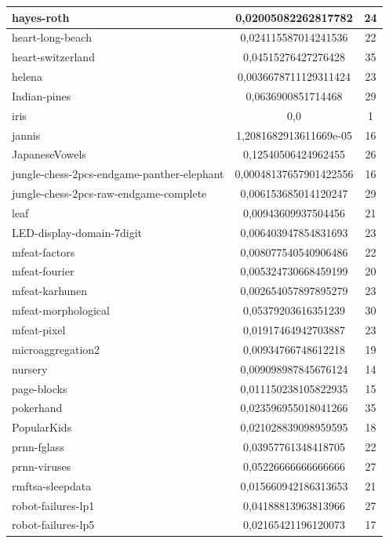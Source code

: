 \documentclass[times,specification,annotation]{itmo-student-thesis}
\begin{document}
\begin{center}
\begin{longtable}{ |m{5cm}|c|c| }
		\hline
		hayes-roth & 0,02005082262817782 & 24 \\
		\hline
		heart-long-beach & 0,024115587014241536 & 22 \\
		\hline
		heart-switzerland & 0,04515276427276428 & 35 \\
		\hline
		helena & 0,0036678711129311424 & 23 \\
		\hline
		Indian-pines & 0,0636900851714468 & 29 \\
		\hline
		iris & 0,0 & 1 \\
		\hline
		jannis & 1,2081682913611669e-05 & 16 \\
		\hline
		JapaneseVowels & 0,12540506424962455 & 26 \\
		\hline
		jungle-chess-2pcs-endgame-panther-elephant & 0,00048137657901422556 & 16 \\
		\hline
		jungle-chess-2pcs-raw-endgame-complete & 0,006153685014120247 & 29 \\
		\hline
		leaf & 0,00943609937504456 & 21 \\
		\hline
		LED-display-domain-7digit & 0,006403947854831693 & 23 \\
		\hline
		mfeat-factors & 0,008077540540906486 & 22 \\
		\hline
		mfeat-fourier & 0,005324730668459199 & 20 \\
		\hline
		mfeat-karhunen & 0,002654057897895279 & 23 \\
		\hline
		mfeat-morphological & 0,05379203616351239 & 30 \\
		\hline
		mfeat-pixel & 0,01917464942703887 & 23 \\
		\hline
		microaggregation2 & 0,00934766748612218 & 19 \\
		\hline
		nursery & 0,009098987845676124 & 14 \\
		\hline
		page-blocks & 0,011150238105822935 & 15 \\
		\hline
		pokerhand & 0,023596955018041266 & 35 \\
		\hline
		PopularKids & 0,021028839098959595 & 18 \\
		\hline
		prnn-fglass & 0,03957761348418705 & 22 \\
		\hline
		prnn-viruses & 0,05226666666666666 & 27 \\
		\hline
		rmftsa-sleepdata & 0,015660942186313653 & 21 \\
		\hline
		robot-failures-lp1 & 0,04188813963813966 & 27 \\
		\hline
		robot-failures-lp5 & 0,02165421196120073 & 17 \\

\end{longtable}
\end{center}
\end{document}
